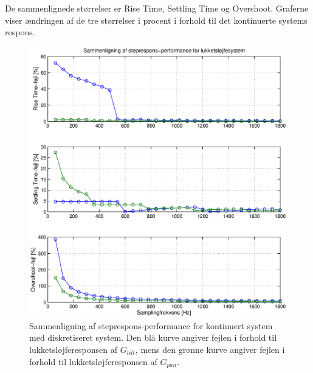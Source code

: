 De sammenlignede størrelser er Rise Time, Settling Time og Overshoot.
Graferne viser ændringen af de tre størrelser i procent i forhold til det kontinuerte systems respons.
\begin{figure}[!th]
\centering
	\includegraphics[width=1\textwidth]{./graphics/diskretStepFreq.eps}

\caption[Sammenligning af steprespons-performance for kontinuert system med diskretiseret system $G_{zoh}$]
{Sammenligning af steprespons-performance for kontinuert system med diskretiseret system.
Den blå kurve angiver fejlen i forhold til lukketsløjferesponsen af $G_{tilt}$,
mens den grønne kurve angiver fejlen i forhold til lukketsløjferesponsen af $G_{pan}$.
}


\label{fig:diskretStepFreq}
\end{figure}

